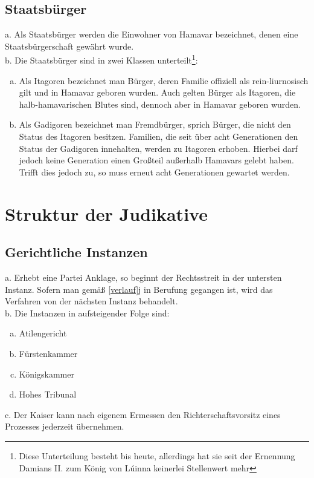 \documentclass{article}
\begin{document}
\subsection{Staatsbürger}
a. Als Staatsbürger werden die Einwohner von Hamavar bezeichnet, denen eine Staatsbürgerschaft gewährt wurde. \\  
b. Die Staatsbürger sind in zwei Klassen unterteilt\footnote{Diese Unterteilung besteht bis heute, allerdings hat sie seit der Ernennung Damians II. zum König von Lúinna keinerlei Stellenwert mehr}:  \\
\begin{enumerate}[a)]
\item Als Itagoren bezeichnet man Bürger, deren Familie offiziell als rein-liurnosisch gilt und in Hamavar geboren wurden. Auch gelten Bürger als Itagoren, die halb-hamavarischen Blutes sind, dennoch aber in Hamavar geboren wurden.  
\item Als Gadigoren bezeichnet man Fremdbürger, sprich Bürger, die nicht den Status des Itagoren besitzen. Familien, die seit über acht Generationen den Status der Gadigoren innehalten, werden zu Itagoren erhoben. Hierbei darf jedoch keine Generation einen Großteil außerhalb Hamavars gelebt haben. Trifft dies jedoch zu, so muss erneut acht Generationen gewartet werden.  
\end{enumerate}

\section{Struktur der Judikative}

\subsection{Gerichtliche Instanzen}
a. Erhebt eine Partei Anklage, so beginnt der Rechtsstreit in der untersten Instanz. Sofern man gemäß \ref{verlauf}j in Berufung gegangen ist, wird das Verfahren von der nächsten Instanz behandelt.\\
b. Die Instanzen in aufsteigender Folge sind:
\begin{enumerate}[a)]
	\item Atilengericht
	\item Fürstenkammer
	\item Königskammer
	\item Hohes Tribunal
\end{enumerate}
c. Der Kaiser kann nach eigenem Ermessen den Richterschaftsvorsitz eines Prozesses jederzeit übernehmen.
\end{document}

